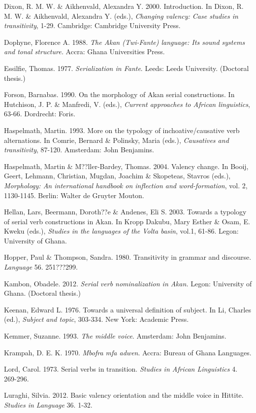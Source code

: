 \documentclass[output=paper]{langsci/langscibook}
\begin{document}
Dixon, R. M. W. \& Aikhenvald, Alexandra Y. 2000. Introduction. In Dixon, R. M. W. \& Aikhenvald, Alexandra Y. (eds.), \textit{Changing valency: Case studies in transitivity}, 1-29. Cambridge: Cambridge University Press.

Dophyne, Florence A. 1988. \textit{The Akan (Twi-Fante) language: Its sound systems and tonal structure.} Accra: Ghana Universities Press.

Essilfie, Thomas. 1977. \textit{Serialization in Fante}. Leeds: Leeds University. (Doctoral thesis.)

Forson, Barnabas. 1990. On the morphology of Akan serial constructions. In Hutchison, J. P. \& Manfredi, V. (eds.), \textit{Current approaches to African linguistics}, 63-66. Dordrecht: Foris.

Haspelmath, Martin. 1993. More on the typology of inchoative/causative verb alternations. In Comrie, Bernard \& Polinsky, Maria (eds.), \textit{Causatives and transitivity}, 87-120. Amsterdam: John Benjamins.

Haspelmath, Martin \& M??ller-Bardey, Thomas. 2004. Valency change. In Booij, Geert, Lehmann, Christian, Mugdan, Joachim \& Skopeteas, Stavros (eds.), \textit{Morphology: An international handbook on inflection and word-formation}, vol. 2, 1130-1145. Berlin: Walter de Gruyter Mouton.

Hellan, Lars, Beermann, Doroth??e \& Andenes, Eli S. 2003. Towards a typology of serial verb constructions in Akan. In Kropp Dakubu, Mary Esther \& Osam, E. Kweku (eds.), \textit{Studies in the languages of the Volta basin}, vol.1, 61-86. Legon: University of Ghana.

Hopper, Paul \& Thompson, Sandra. 1980. Transitivity in grammar and discourse. \textit{Language} 56. 251???299.

Kambon, Obadele. 2012. \textit{Serial verb nominalization in Akan.} Legon: University of Ghana. (Doctoral thesis.)

Keenan, Edward L. 1976. Towards a universal definition of subject. In Li, Charles (ed.), \textit{Subject and topic}, 303-334. New York: Academic Press.

Kemmer, Suzanne. 1993. \textit{The middle voice}. Amsterdam: John Benjamins.

Krampah, D. E. K. 1970. \emph{Mbofra mfa adwen}. Accra: Bureau of Ghana Languages.

Lord, Carol. 1973. Serial verbs in transition. \textit{Studies in African Linguistics} 4. 269-296.

Luraghi, Silvia. 2012. Basic valency orientation and the middle voice in Hittite. \textit{Studies in Language} 36. 1-32.
\end{document}
